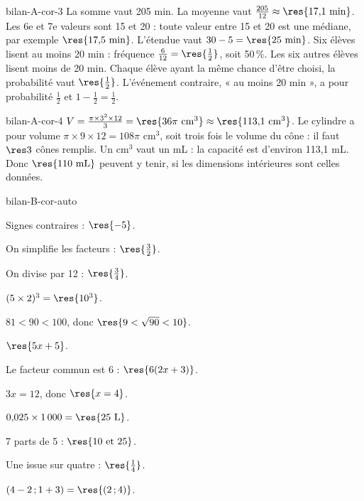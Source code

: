 \begin{blocEdition}{bilan-A-cor-3}
La somme vaut 205 min. La moyenne vaut $\frac{205}{12}\approx\res{17{,}1\ \mathrm{min}}$. Les 6e et 7e valeurs sont 15 et 20 : toute valeur entre 15 et 20 est une médiane, par exemple $\res{17{,}5\ \mathrm{min}}$.
L’étendue vaut $30-5=\res{25\ \mathrm{min}}$. Six élèves lisent au moins 20 min : fréquence $\frac6{12}=\res{\frac12}$, soit 50\,\%.
Les six autres élèves lisent moins de 20 min. Chaque élève ayant la même chance d’être choisi, la probabilité vaut $\res{\frac12}$. L’événement contraire, « au moins 20 min », a pour probabilité $\frac12$ et $1-\frac12=\frac12$.
\end{blocEdition}
\begin{blocEdition}{bilan-A-cor-4}
$V=\frac{\pi\times3^2\times12}3=\res{36\pi\ \mathrm{cm}^3}\approx\res{113{,}1\ \mathrm{cm}^3}$.
Le cylindre a pour volume $\pi\times9\times12=108\pi$ cm$^3$, soit trois fois le volume du cône : il faut $\res3$ cônes remplis.
Un cm$^3$ vaut un mL : la capacité est d’environ 113,1 mL. Donc $\res{110\ \mathrm{mL}}$ peuvent y tenir, si les dimensions intérieures sont celles données.\label{fig-bilan-A-cor-4}

\end{blocEdition}
\begin{blocEdition}{bilan-B-cor-auto}
\begin{questions}
\item Signes contraires : $\res{-5}$.
\item On simplifie les facteurs : $\res{\frac32}$.
\item On divise par 12 : $\res{\frac34}$.
\item $(5\times2)^3=\res{10^3}$.
\item $81<90<100$, donc $\res{9<\sqrt{90}<10}$.
\item $\res{5x+5}$.
\item Le facteur commun est 6 : $\res{6(2x+3)}$.
\item $3x=12$, donc $\res{x=4}$.
\item $0{,}025\times1\,000=\res{25\ \mathrm L}$.
\item 7 parts de 5 : $\res{10\text{ et }25}$.
\item Une issue sur quatre : $\res{\frac14}$.
\item $(4-2\,;1+3)=\res{(2\,;4)}$.\end{questions}
\end{blocEdition}
